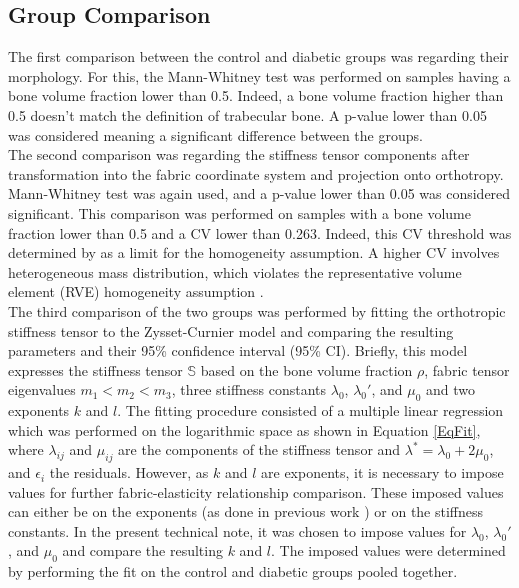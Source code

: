 \documentclass[a4paper,fleqn]{DC_ArtStyle}
\begin{document}
	\subsection{Group Comparison}
	The first comparison between the control and diabetic groups was regarding their morphology.
	For this, the Mann-Whitney test was performed on samples having a bone volume fraction lower than 0.5.
	Indeed, a bone volume fraction higher than 0.5 doesn't match the definition of trabecular bone.
	A p-value lower than 0.05 was considered meaning a significant difference between the groups.
	\\[0.5em]
	The second comparison was regarding the stiffness tensor components after transformation into the fabric coordinate system and projection onto orthotropy.
	Mann-Whitney test was again used, and a p-value lower than 0.05 was considered significant.
	This comparison was performed on samples with a bone volume fraction lower than 0.5 and a CV lower than 0.263.
	Indeed, this CV threshold was determined by \citeauthor{Panyasantisuk2015} \cite{Panyasantisuk2015} as a limit for the homogeneity assumption.
	A higher CV involves heterogeneous mass distribution, which violates the representative volume element (RVE) homogeneity assumption \cite{Cowin2007}.
	\\[0.5em]
	The third comparison of the two groups was performed by fitting the orthotropic stiffness tensor to the Zysset-Curnier model \cite{Zysset1995} and comparing the resulting parameters and their 95\% confidence interval (95\% CI).
	Briefly, this model expresses the stiffness tensor $\mathbb{S}$ based on the bone volume fraction $\rho$, fabric tensor eigenvalues $m_1 < m_2 < m_3$, three stiffness constants $\lambda_0$, $\lambda_0'$, and $\mu_0$ and two exponents $k$ and $l$.
	The fitting procedure consisted of a multiple linear regression which was performed on the logarithmic space as shown in Equation \ref{EqFit}, where $\lambda_{ij}$ and $\mu_{ij}$ are the components of the stiffness tensor and $\lambda^{*} = \lambda_0 + 2\mu_0$, and $\epsilon_i$ the residuals.
	However, as $k$ and $l$ are exponents, it is necessary to impose values for further fabric-elasticity relationship comparison.
	These imposed values can either be on the exponents (as done in previous work \cite{Simon2022}) or on the stiffness constants.
	In the present technical note, it was chosen to impose values for $\lambda_0$, $\lambda_0'$, and $\mu_0$ and compare the resulting $k$ and $l$.
	The imposed values were determined by performing the fit on the control and diabetic groups pooled together.
\end{document}
